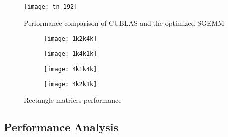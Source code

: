 \begin{figure}[htbp]
\begin{center}
\texttt{[image: tn\_192]}
\caption{Performance comparison of CUBLAS and the optimized SGEMM }
\label{fig:sgemm_tn}
\end{center}
\end{figure}


\begin{figure*}
    \begin{subfigure}[htbp]{0.5\textwidth}
        \texttt{[image: 1k2k4k]}
        \label{fig:1k2k4k}
    \end{subfigure}
    \begin{subfigure}[htbp]{0.5\textwidth}
\begin{center}
        \texttt{[image: 1k4k1k]}
\end{center}
        \label{fig:1k4k1k}
    \end{subfigure}
    \begin{subfigure}[htbp]{0.5\textwidth}
        \texttt{[image: 4k1k4k]}
        \label{fig:4k1k4k}
    \end{subfigure}
    \begin{subfigure}[htbp]{0.5\textwidth}
        \texttt{[image: 4k2k1k]}
        \label{fig:4k2k1k}
    \end{subfigure}
    \caption{Rectangle matrices performance}
    \label{fig:rectangle}
\end{figure*}

\subsection{Performance Analysis}

